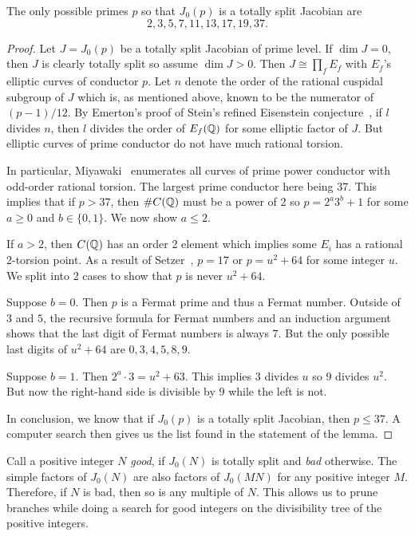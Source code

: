 \documentclass[11pt, proquest]{uwthesis}
\begin{document}
\begin{lemma}
    \label{lemma:good_primes}
    The only possible primes $p$ so that $J_0(p)$ is a totally split Jacobian are
    \[
        2, 3, 5, 7, 11, 13, 17, 19, 37.
    \]
\end{lemma}
\begin{proof}
    Let $J=J_0(p)$ be a totally split Jacobian of prime level. If $\dim J=0$,
    then $J$ is clearly totally split so assume $\dim J>0$. Then $J\cong
    \prod_f E_f$ with $E_f$'s elliptic curves of conductor $p$. Let $n$ denote
    the order of the rational cuspidal subgroup of $J$ which is, as mentioned
    above, known to be the numerator of $(p-1)/12$. By Emerton's proof of
    Stein's refined Eisenstein conjecture~\cite[Theorem B]{emerton:optimal}, if
    $l$ divides $n$, then $l$ divides the order of $E_f(\mathbb{Q})$ for some elliptic
    factor of $J$. But elliptic curves of prime conductor do not have much
    rational torsion.

    In particular, Miyawaki~\cite{miyawaki:ell_prime} enumerates all curves of prime
    power conductor with odd-order rational torsion. The largest prime
    conductor here being 37. This implies that if $p>37$, then $\#C(\mathbb{Q})$ must
    be a power of 2 so $p=2^a 3^b + 1$ for some $a\geq 0$ and $b\in \{0,1\}$.
    We now show $a\leq 2$.

    If $a>2$, then $C(\mathbb{Q})$ has an order 2 element which implies some $E_i$ has
    a rational 2-torsion point. As a result of Setzer~\cite[Theorem
    2]{setzer:ell_prime}, $p=17$ or $p=u^2+64$ for some integer $u$. We split into 2
    cases to show that $p$ is never $u^2+64$.

    Suppose $b=0$. Then $p$ is a Fermat prime and thus a Fermat number. Outside
    of $3$ and $5$, the recursive formula for Fermat numbers and an induction
    argument shows that the last digit of Fermat numbers is always $7$. But the
    only possible last digits of $u^2+64$ are $0, 3, 4, 5, 8, 9$.

    Suppose $b=1$. Then $2^a\cdot 3 = u^2+63$. This implies $3$ divides $u$ so
    $9$ divides $u^2$. But now the right-hand side is divisible by $9$ while the
    left is not.

    In conclusion, we know that if $J_0(p)$ is a totally split Jacobian, then $p\leq
    37$. A computer search then gives us the list found in the statement of the
    lemma.
\end{proof}

Call a positive integer $N$ \emph{good}, if $J_0(N)$ is totally split and
\emph{bad} otherwise. The simple factors of $J_0(N)$ are also factors of
$J_0(MN)$ for any positive integer $M$. Therefore, if $N$ is bad, then so is
any multiple of $N$. This allows us to prune branches while doing a search for
good integers on the divisibility tree of the positive integers.
\end{document}
